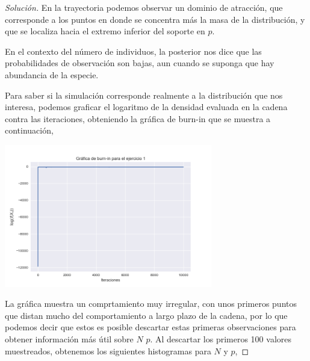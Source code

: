 \documentclass{article}
\begin{document}
\begin{enumerate}
\begin{proof}[Solución]
        En la trayectoria podemos observar un dominio de atracción, que corresponde a 
        los puntos en donde se concentra más la masa de la distribución, y que se localiza
        hacia el extremo inferior del soporte en $p$.

        En el contexto del número de individuos, la posterior nos dice que las probabilidades
        de observación son bajas, aun cuando se suponga que hay abundancia de la especie.

        Para saber si la simulación corresponde realmente a la distribución que nos interesa,
        podemos graficar el logaritmo de la densidad evaluada en la cadena contra las
        iteraciones, obteniendo la gráfica de burn-in que se muestra a continuación,

        \begin{center}
            \includegraphics[width=0.68\textwidth]{Tarea9/burnin1.png}
        \end{center}

        La gráfica muestra un comprtamiento muy irregular, con unos primeros puntos que 
        distan mucho del comportamiento a largo plazo de la cadena, por lo que podemos decir
        que estos es posible descartar estas primeras observaciones para obtener información
        más útil sobre $N$ $p$. Al descartar los primeros 100 valores muestreados, obtenemos
        los siguientes histogramas para $N$ y $p$,


\end{proof}
\end{enumerate}
\end{document}
